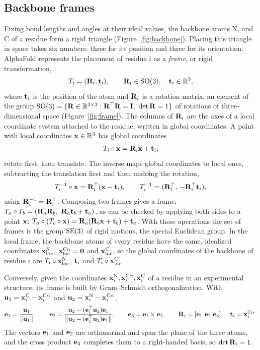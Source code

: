 \subsection{Backbone frames}

Fixing bond lengths and angles at their ideal values, the backbone atoms N, \Ca{} and C of a residue form a rigid triangle (Figure~\ref{fig:backbone}). Placing this triangle in space takes six numbers: three for its position and three for its orientation. AlphaFold represents the placement of residue $i$ as a \emph{frame}, or rigid transformation,
\begin{equation}
  T_i = (\mathbf{R}_i,\mathbf{t}_i), \qquad \mathbf{R}_i\in\mathrm{SO}(3), \quad \mathbf{t}_i\in\mathbb{R}^3,
\end{equation}
where $\mathbf{t}_i$ is the position of the \Ca{} atom and $\mathbf{R}_i$ is a rotation matrix, an element of the group $\SO=\{\mR\in\R^{3\times3}:\mR^\top\mR=\mI,\ \det\mR=1\}$ of rotations of three-dimensional space (Figure~\ref{fig:frame}). The columns of $\mathbf{R}_i$ are the axes of a local coordinate system attached to the residue, written in global coordinates. A point with local coordinates $\mathbf{x}\in\mathbb{R}^3$ has global coordinates
\begin{equation}
  T_i\circ\mathbf{x} = \mathbf{R}_i\mathbf{x} + \mathbf{t}_i ,
  \label{eq:frame_action}
\end{equation}
rotate first, then translate. The inverse maps global coordinates to local ones, subtracting the translation first and then undoing the rotation,
\begin{equation}
  T_i^{-1}\circ\mathbf{x} = \mathbf{R}_i^\top(\mathbf{x} - \mathbf{t}_i), \qquad T_i^{-1} = (\mathbf{R}_i^\top,\,-\mathbf{R}_i^\top\mathbf{t}_i),
\end{equation}
using $\mathbf{R}_i^{-1}=\mathbf{R}_i^\top$. Composing two frames gives a frame, $T_a\circ T_b = (\mR_a\mR_b,\ \mR_a\vt_b+\vt_a)$, as can be checked by applying both sides to a point $\mathbf{x}$: $T_a\circ(T_b\circ\mathbf{x})=\mathbf{R}_a(\mathbf{R}_b\mathbf{x}+\mathbf{t}_b)+\mathbf{t}_a$. With these operations the set of frames is the group $\mathrm{SE}(3)$ of rigid motions, the special Euclidean group. In the local frame, the backbone atoms of every residue have the same, idealized coordinates $\mathbf{x}^{\text{N}}_{\text{loc}}$, $\mathbf{x}^{\text{C}\alpha}_{\text{loc}}=\mathbf{0}$ and $\mathbf{x}^{\text{C}}_{\text{loc}}$, so the global coordinates of the backbone of residue $i$ are $T_i\circ\mathbf{x}^{\text{N}}_{\text{loc}}$, $\mathbf{t}_i$ and $T_i\circ\mathbf{x}^{\text{C}}_{\text{loc}}$.

Conversely, given the coordinates $\mathbf{x}^{\text{N}}_i,\mathbf{x}^{\text{C}\alpha}_i,\mathbf{x}^{\text{C}}_i$ of a residue in an experimental structure, its frame is built by Gram--Schmidt orthogonalization. With $\mathbf{u}_1=\mathbf{x}^{\text{C}}_i-\mathbf{x}^{\text{C}\alpha}_i$ and $\mathbf{u}_2=\mathbf{x}^{\text{N}}_i-\mathbf{x}^{\text{C}\alpha}_i$,
\begin{equation}
  \mathbf{e}_1 = \frac{\mathbf{u}_1}{\|\mathbf{u}_1\|}, \qquad
  \mathbf{e}_2 = \frac{\mathbf{u}_2-(\mathbf{e}_1^\top\mathbf{u}_2)\mathbf{e}_1}{\|\mathbf{u}_2-(\mathbf{e}_1^\top\mathbf{u}_2)\mathbf{e}_1\|}, \qquad
  \mathbf{e}_3 = \mathbf{e}_1\times\mathbf{e}_2, \qquad
  \mathbf{R}_i = [\mathbf{e}_1\ \mathbf{e}_2\ \mathbf{e}_3], \quad \mathbf{t}_i = \mathbf{x}^{\text{C}\alpha}_i .
  \label{eq:gram_schmidt}
\end{equation}
The vectors $\mathbf{e}_1$ and $\mathbf{e}_2$ are orthonormal and span the plane of the three atoms, and the cross product $\mathbf{e}_3$ completes them to a right-handed basis, so $\det\mathbf{R}_i=1$.

